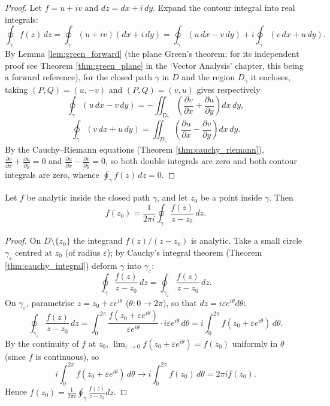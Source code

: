 \begin{proof}
Let $f = u + iv$ and $dz = dx + i\,dy$. Expand the contour integral into real integrals:
\[
\oint_\gamma f(z)\,dz = \oint_\gamma (u + iv)(dx + i\,dy) = \oint_\gamma (u\,dx - v\,dy) + i \oint_\gamma (v\,dx + u\,dy).
\]
By Lemma \ref{lem:green_forward} (the plane Green's theorem; for its independent proof see Theorem \ref{thm:green_plane} in the `Vector Analysis' chapter, this being a forward reference), for the closed path $\gamma$ in $D$ and the region $D_\gamma$ it encloses, taking $(P,Q) = (u,-v)$ and $(P,Q) = (v,u)$ gives respectively
\[
\oint_\gamma (u\,dx - v\,dy) = -\iint_{D_\gamma} \left( \frac{\partial v}{\partial x} + \frac{\partial u}{\partial y} \right) dx\,dy,
\]
\[
\oint_\gamma (v\,dx + u\,dy) = \iint_{D_\gamma} \left( \frac{\partial u}{\partial x} - \frac{\partial v}{\partial y} \right) dx\,dy.
\]
By the Cauchy--Riemann equations (Theorem \ref{thm:cauchy_riemann}), $\frac{\partial v}{\partial x} + \frac{\partial u}{\partial y} = 0$ and $\frac{\partial u}{\partial x} - \frac{\partial v}{\partial y} = 0$, so both double integrals are zero and both contour integrals are zero, whence $\oint_\gamma f(z)\,dz = 0$.
\end{proof}

\begin{theorem}\label{thm:cauchy_integral_formula}
Let $f$ be analytic inside the closed path $\gamma$, and let $z_0$ be a point inside $\gamma$. Then
\[
f(z_0) = \frac{1}{2\pi i} \oint_\gamma \frac{f(z)}{z - z_0}\,dz.
\]
\end{theorem}

\begin{proof}
On $D \setminus \{z_0\}$ the integrand $f(z)/(z-z_0)$ is analytic. Take a small circle $\gamma_\varepsilon$ centred at $z_0$ (of radius $\varepsilon$); by Cauchy's integral theorem (Theorem \ref{thm:cauchy_integral}) deform $\gamma$ into $\gamma_\varepsilon$:
\[
\oint_\gamma \frac{f(z)}{z-z_0}\,dz = \oint_{\gamma_\varepsilon} \frac{f(z)}{z-z_0}\,dz.
\]
On $\gamma_\varepsilon$, parametrise $z = z_0 + \varepsilon e^{i\theta}$ ($\theta: 0 \to 2\pi$), so that $dz = i\varepsilon e^{i\theta}d\theta$:
\[
\oint_{\gamma_\varepsilon} \frac{f(z)}{z-z_0}\,dz = \int_0^{2\pi} \frac{f(z_0 + \varepsilon e^{i\theta})}{\varepsilon e^{i\theta}} \cdot i\varepsilon e^{i\theta}\,d\theta = i\int_0^{2\pi} f(z_0 + \varepsilon e^{i\theta})\,d\theta.
\]
By the continuity of $f$ at $z_0$, $\lim_{\varepsilon \to 0} f(z_0 + \varepsilon e^{i\theta}) = f(z_0)$ uniformly in $\theta$ (since $f$ is continuous), so
\[
i\int_0^{2\pi} f(z_0 + \varepsilon e^{i\theta})\,d\theta \to i\int_0^{2\pi} f(z_0)\,d\theta = 2\pi i f(z_0).
\]
Hence $f(z_0) = \frac{1}{2\pi i}\oint_\gamma \frac{f(z)}{z-z_0}dz$.
\end{proof}

